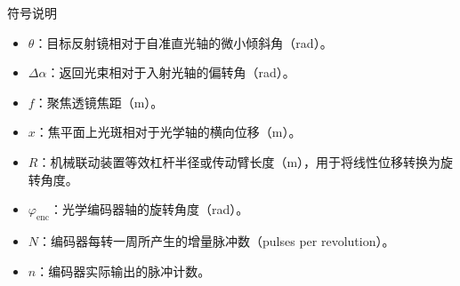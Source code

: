 \begin{ubox2}{符号说明}
	\begin{itemize}
		\item $\theta$：目标反射镜相对于自准直光轴的微小倾斜角（rad）。
		\item $\Delta \alpha$：返回光束相对于入射光轴的偏转角（rad）。
		\item $f$：聚焦透镜焦距（m）。
		\item $x$：焦平面上光斑相对于光学轴的横向位移（m）。
		\item $R$：机械联动装置等效杠杆半径或传动臂长度（m），用于将线性位移转换为旋转角度。
		\item $\varphi_{\mathrm{enc}}$：光学编码器轴的旋转角度（rad）。
		\item $N$：编码器每转一周所产生的增量脉冲数（pulses per revolution）。
		\item $n$：编码器实际输出的脉冲计数。
	\end{itemize}
\end{ubox2}

